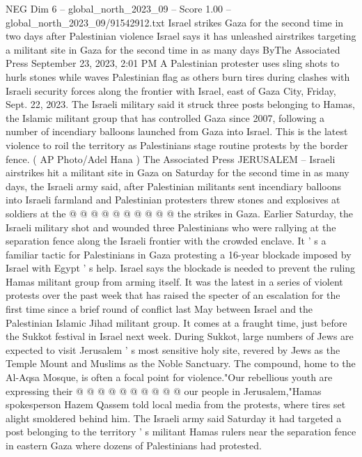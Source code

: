 \begin{textsample}{NEG Dim 6 – global\_north\_2023\_09 – Score 1.00 – global\_north\_2023\_09/91542912.txt}  \label{ex:f6_neg_380}
Israel strikes Gaza for the second time in two days after Palestinian violence Israel says it has unleashed airstrikes targeting a militant site in Gaza for the second time in as many days ByThe Associated Press September 23, 2023, 2:01 PM A Palestinian protester uses sling shots to hurls stones while waves Palestinian flag as others burn tires during clashes with Israeli security forces along the frontier with Israel, east of Gaza City, Friday, Sept. 22, 2023.
The Israeli military said it struck three posts belonging to Hamas, the Islamic militant group that has controlled Gaza since 2007, following a number of incendiary balloons launched from Gaza into Israel.
This is the latest violence to roil the territory as Palestinians stage routine protests by the border fence. ( AP Photo/Adel Hana ) The Associated Press JERUSALEM -- Israeli airstrikes hit a militant site in Gaza on Saturday for the second time in as many days, the Israeli army said, after Palestinian militants sent incendiary balloons into Israeli farmland and Palestinian protesters threw stones and explosives at soldiers at the @ @ @ @ @ @ @ @ @ @ the strikes in Gaza.
Earlier Saturday, the Israeli military shot and wounded three Palestinians who were rallying at the separation fence along the Israeli frontier with the crowded enclave.
It ' s a familiar tactic for Palestinians in Gaza protesting a 16-year blockade imposed by Israel with Egypt ' s help.
Israel says the blockade is needed to prevent the ruling Hamas militant group from arming itself.
It was the latest in a series of violent protests over the past week that has raised the specter of an escalation for the first time since a brief round of conflict last May between Israel and the Palestinian Islamic Jihad militant group.
It comes at a fraught time, just before the Sukkot festival in Israel next week.
During Sukkot, large numbers of Jews are expected to visit Jerusalem ' s most sensitive holy site, revered by Jews as the Temple Mount and Muslims as the Noble Sanctuary.
The compound, home to the Al-Aqsa Mosque, is often a focal point for violence."Our rebellious youth are expressing their @ @ @ @ @ @ @ @ @ @ our people in Jerusalem,"Hamas spokesperson Hazem Qassem told local media from the protests, where tires set alight smoldered behind him.
The Israeli army said Saturday it had targeted a post belonging to the territory ' s militant Hamas rulers near the separation fence in eastern Gaza where dozens of Palestinians had protested.

\end{textsample}
